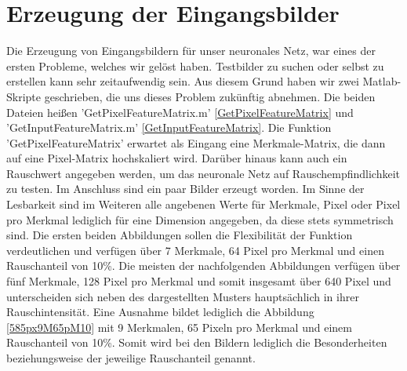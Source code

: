 \section{Erzeugung der Eingangsbilder}

Die Erzeugung von Eingangsbildern für unser neuronales Netz, war eines der ersten Probleme, welches wir gelöst haben. Testbilder zu suchen oder selbst zu erstellen kann sehr zeitaufwendig sein. Aus diesem Grund haben wir zwei Matlab-Skripte geschrieben, die uns dieses Problem zukünftig abnehmen. Die beiden Dateien heißen 'GetPixelFeatureMatrix.m' \ref{GetPixelFeatureMatrix} und 'GetInputFeatureMatrix.m' \ref{GetInputFeatureMatrix}. Die Funktion 'GetPixelFeatureMatrix' erwartet als Eingang eine Merkmale-Matrix, die dann auf eine Pixel-Matrix hochskaliert wird. Darüber hinaus kann auch ein Rauschwert angegeben werden, um das neuronale Netz auf Rauschempfindlichkeit zu testen. Im Anschluss sind ein paar Bilder erzeugt worden. Im Sinne der Lesbarkeit sind im Weiteren alle angebenen Werte für Merkmale, Pixel oder Pixel pro Merkmal lediglich für eine Dimension angegeben, da diese stets symmetrisch sind. Die ersten beiden Abbildungen sollen die Flexibilität der Funktion verdeutlichen und verfügen über 7 Merkmale, 64 Pixel pro Merkmal und einen Rauschanteil von 10\%. Die meisten der nachfolgenden Abbildungen verfügen über fünf Merkmale, 128 Pixel pro Merkmal und somit insgesamt über 640 Pixel und unterscheiden sich neben des dargestellten Musters hauptsächlich in ihrer Rauschintensität. Eine Ausnahme bildet lediglich die Abbildung \ref*{585px9M65pM10} mit 9 Merkmalen, 65 Pixeln pro Merkmal und einem Rauschanteil von 10\%. Somit wird bei den Bildern lediglich die Besonderheiten beziehungsweise der jeweilige Rauschanteil genannt.

